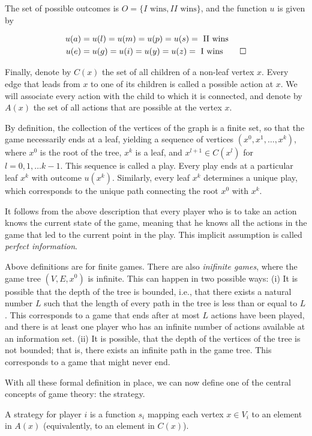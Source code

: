 The set of possible outcomes is $O = \{I \text{ wins}, II \text{ wins} \}$, and the function $u$ is given by

\begin{align*}
u(a) &= u(l) = u(m) = u(p) = u(s) = \text{ II wins} \\
u(e) &= u(g) = u(i) = u(y) = u(z) = \text{ I wins} \qed
\end{align*}

Finally, denote by $C(x)$ the set of all children of a non-leaf vertex $x$. Every edge that leads from $x$ to one of its children is called a possible action at $x$. We will associate every action with the child to which it is connected, and denote by $A(x)$ the set of all actions that are possible at the vertex $x$.

By definition, the collection of the vertices of the graph is a finite set, so that the game necessarily ends at a leaf, yielding a sequence of vertices $(x^0, x^1, \ldots , x^k)$, where $x^0$ is the root of the tree, $x^k$ is a leaf, and $x^{l+1} \in C(x^l)$ for $l = 0, 1, \ldots k-1$. This sequence is called a play. Every play ends at a particular leaf $x^k$ with outcome $u(x^k)$. Similarly, every leaf $x^k$ determines a unique play, which corresponds to the unique path connecting the root $x^0$ with $x^k$.

It follows from the above description that every player who is to take an action knows the current state of the game, meaning that he knows all the actions in the game that led to the current point in the play. This implicit assumption is called \emph{perfect information}.

Above definitions are for finite games. There are also \emph{inifinite games}, where the game tree $(V, E, x^0)$ is infinite. This can happen in two possible ways: (i) It is possible that the depth of the tree is bounded, i.e., that there exists a natural number $L$ such that the length of every path in the tree is less than or equal to $L$. This corresponds to a game that ends after at most $L$ actions have been played, and there is at least one player who has an infinite number of actions available at an information set. (ii) It is possible, that the depth of the vertices of the tree is not bounded; that is, there exists an infinite path in the game tree. This corresponds to a game that might never end.


With all these formal definition in place, we can now define one of the central concepts of game theory: the strategy.

\begin{definition}
A strategy for player $i$ is a function $s_i$ mapping each vertex $x \in V_i$ to an element in $A(x)$ (equivalently, to an element in $C(x)$).
\end{definition}

